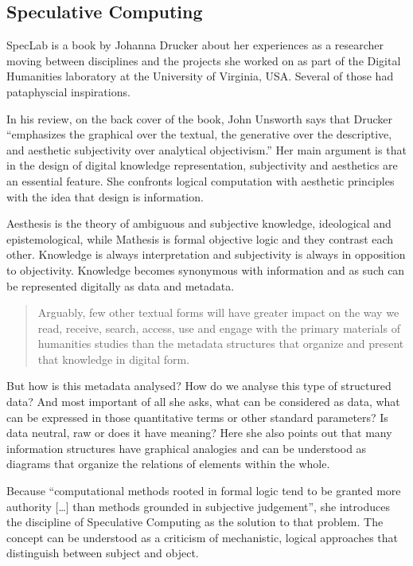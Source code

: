 \subsection{Speculative Computing}

SpecLab \citep{Drucker2009} is a book by Johanna Drucker about her experiences as a researcher moving between disciplines and the projects she worked on as part of the Digital Humanities laboratory at the University of Virginia, USA. Several of those had pataphyscial inspirations.

In his review, on the back cover of the book, John Unsworth says that Drucker ``emphasizes the graphical over the textual, the generative over the descriptive, and aesthetic subjectivity over analytical objectivism.'' Her main argument is that in the design of digital knowledge representation, subjectivity and aesthetics are an essential feature. She confronts logical computation with aesthetic principles with the idea that design is information.

Aesthesis is the theory of ambiguous and subjective knowledge, ideological and epistemological, while Mathesis is formal objective logic and they contrast each other. Knowledge is always interpretation and subjectivity is always in opposition to objectivity. Knowledge becomes synonymous with information and as such can be represented digitally as data and metadata.

\begin{quote}
  Arguably, few other textual forms will have greater impact on the way we read, receive, search, access, use and engage with the primary materials of humanities studies than the metadata structures that organize and present that knowledge in digital form. \citep[p.9]{Drucker2009}
\end{quote}

But how is this metadata analysed? How do we analyse this type of structured data? And most important of all she asks, what can be considered as data, what can be expressed in those quantitative terms or other standard parameters? Is data neutral, raw or does it have meaning? Here she also points out that many information structures have graphical analogies and can be understood as diagrams that organize the relations of elements within the whole.

Because ``computational methods rooted in formal logic tend to be granted more authority […] than methods grounded in subjective judgement'', she introduces the discipline of Speculative Computing as the solution to that problem.  The concept can be understood as a criticism of mechanistic, logical approaches that distinguish between subject and object.

